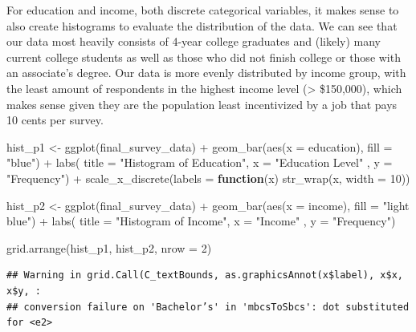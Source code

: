 \documentclass[
]{article}
\newenvironment{Shaded}{\begin{snugshade}}{\end{snugshade}}
\newcommand{\AttributeTok}[1]{\textcolor[rgb]{0.77,0.63,0.00}{#1}}
\newcommand{\ControlFlowTok}[1]{\textcolor[rgb]{0.13,0.29,0.53}{\textbf{#1}}}
\newcommand{\DecValTok}[1]{\textcolor[rgb]{0.00,0.00,0.81}{#1}}
\newcommand{\FunctionTok}[1]{\textcolor[rgb]{0.00,0.00,0.00}{#1}}
\newcommand{\NormalTok}[1]{#1}
\newcommand{\OtherTok}[1]{\textcolor[rgb]{0.56,0.35,0.01}{#1}}
\newcommand{\SpecialCharTok}[1]{\textcolor[rgb]{0.00,0.00,0.00}{#1}}
\newcommand{\StringTok}[1]{\textcolor[rgb]{0.31,0.60,0.02}{#1}}
\begin{document}
For education and income, both discrete categorical variables, it makes
sense to also create histograms to evaluate the distribution of the
data. We can see that our data most heavily consists of 4-year college
graduates and (likely) many current college students as well as those
who did not finish college or those with an associate's degree. Our data
is more evenly distributed by income group, with the least amount of
respondents in the highest income level (\textgreater{} \$150,000),
which makes sense given they are the population least incentivized by a
job that pays 10 cents per survey.

\begin{Shaded}
\begin{Highlighting}[]
\NormalTok{hist\_p1 }\OtherTok{\textless{}{-}} \FunctionTok{ggplot}\NormalTok{(final\_survey\_data) }\SpecialCharTok{+} 
  \FunctionTok{geom\_bar}\NormalTok{(}\FunctionTok{aes}\NormalTok{(}\AttributeTok{x =}\NormalTok{ education), }\AttributeTok{fill =} \StringTok{"blue"}\NormalTok{) }\SpecialCharTok{+}
  \FunctionTok{labs}\NormalTok{( }\AttributeTok{title =} \StringTok{"Histogram of Education"}\NormalTok{, }\AttributeTok{x =} \StringTok{"Education Level"}\NormalTok{ , }\AttributeTok{y =} \StringTok{"Frequency"}\NormalTok{) }\SpecialCharTok{+} 
  \FunctionTok{scale\_x\_discrete}\NormalTok{(}\AttributeTok{labels =} \ControlFlowTok{function}\NormalTok{(x) }\FunctionTok{str\_wrap}\NormalTok{(x, }\AttributeTok{width =} \DecValTok{10}\NormalTok{))}

\NormalTok{hist\_p2 }\OtherTok{\textless{}{-}} \FunctionTok{ggplot}\NormalTok{(final\_survey\_data) }\SpecialCharTok{+} 
  \FunctionTok{geom\_bar}\NormalTok{(}\FunctionTok{aes}\NormalTok{(}\AttributeTok{x =}\NormalTok{ income), }\AttributeTok{fill =} \StringTok{"light blue"}\NormalTok{) }\SpecialCharTok{+}
  \FunctionTok{labs}\NormalTok{( }\AttributeTok{title =} \StringTok{"Histogram of Income"}\NormalTok{, }\AttributeTok{x =} \StringTok{"Income"}\NormalTok{ , }\AttributeTok{y =} \StringTok{"Frequency"}\NormalTok{)}

\FunctionTok{grid.arrange}\NormalTok{(hist\_p1, hist\_p2, }\AttributeTok{nrow =} \DecValTok{2}\NormalTok{)}
\end{Highlighting}
\end{Shaded}

\begin{verbatim}
## Warning in grid.Call(C_textBounds, as.graphicsAnnot(x$label), x$x, x$y, :
## conversion failure on 'Bachelor’s' in 'mbcsToSbcs': dot substituted for <e2>
\end{verbatim}
\end{document}
